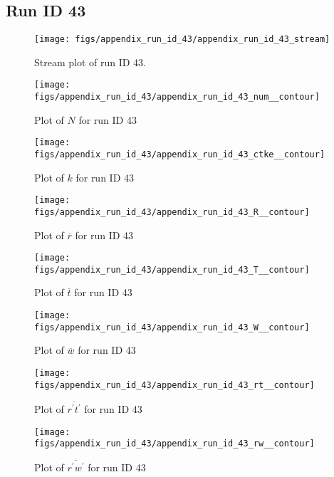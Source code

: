 \subsection{Run ID 43}
\begin{figure}[H]
\centering
\texttt{[image: figs/appendix\_run\_id\_43/appendix\_run\_id\_43\_stream]}
\caption{Stream plot of run ID 43.}
\label{fig:appendix_run_id_43_stream}
\end{figure}


\begin{figure}[H]
\centering
\texttt{[image: figs/appendix\_run\_id\_43/appendix\_run\_id\_43\_num\_\_contour]}
\caption{Plot of $N$ for run ID 43}
\label{fig:appendix_run_id_43_num__contour}
\end{figure}


\begin{figure}[H]
\centering
\texttt{[image: figs/appendix\_run\_id\_43/appendix\_run\_id\_43\_ctke\_\_contour]}
\caption{Plot of $k$ for run ID 43}
\label{fig:appendix_run_id_43_ctke__contour}
\end{figure}


\begin{figure}[H]
\centering
\texttt{[image: figs/appendix\_run\_id\_43/appendix\_run\_id\_43\_R\_\_contour]}
\caption{Plot of $\overline{r}$ for run ID 43}
\label{fig:appendix_run_id_43_R__contour}
\end{figure}


\begin{figure}[H]
\centering
\texttt{[image: figs/appendix\_run\_id\_43/appendix\_run\_id\_43\_T\_\_contour]}
\caption{Plot of $\overline{t}$ for run ID 43}
\label{fig:appendix_run_id_43_T__contour}
\end{figure}


\begin{figure}[H]
\centering
\texttt{[image: figs/appendix\_run\_id\_43/appendix\_run\_id\_43\_W\_\_contour]}
\caption{Plot of $\overline{w}$ for run ID 43}
\label{fig:appendix_run_id_43_W__contour}
\end{figure}


\begin{figure}[H]
\centering
\texttt{[image: figs/appendix\_run\_id\_43/appendix\_run\_id\_43\_rt\_\_contour]}
\caption{Plot of $\overline{r^\prime t^\prime}$ for run ID 43}
\label{fig:appendix_run_id_43_rt__contour}
\end{figure}


\begin{figure}[H]
\centering
\texttt{[image: figs/appendix\_run\_id\_43/appendix\_run\_id\_43\_rw\_\_contour]}
\caption{Plot of $\overline{r^\prime w^\prime}$ for run ID 43}
\label{fig:appendix_run_id_43_rw__contour}
\end{figure}


